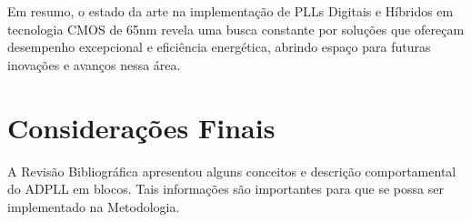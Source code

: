 Em resumo, o estado da arte na implementação de PLLs Digitais e Híbridos em tecnologia CMOS de 65nm revela uma busca constante por soluções que ofereçam desempenho excepcional e eficiência energética, abrindo espaço para futuras inovações e avanços nessa área.

%
%
%
%

\section{Considerações Finais}

A Revisão Bibliográfica apresentou alguns conceitos e descrição comportamental do ADPLL em blocos. Tais informações são importantes para que se possa ser implementado na Metodologia.

